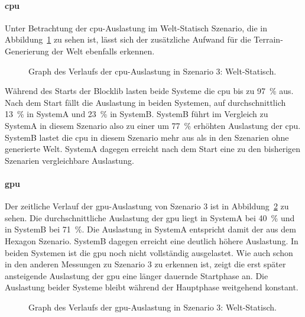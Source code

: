 \paragraph{\ac{cpu}}
Unter Betrachtung der \ac{cpu}-Auslastung im Welt-Statisch Szenario, die in Abbildung~\ref{fig:seed-0-static-cpu} zu sehen ist, lässt sich der zusätzliche Aufwand für die Terrain-Generierung der Welt ebenfalls erkennen.
\begin{figure}[!htbp]
	\caption[Graph des Verlaufs der -Auslastung in Szenario 3: Welt-Statisch.]{Graph des Verlaufs der \ac{cpu}-Auslastung in Szenario 3: Welt-Statisch.}\label{fig:seed-0-static-cpu}
\end{figure}
Während des Starts der Blocklib lasten beide Systeme die \ac{cpu} bis zu \SI{97}{\percent} aus. Nach dem Start fällt die Auslastung in beiden Systemen, auf durchschnittlich \SI{13}{\percent} in SystemA und \SI{23}{\percent} in SystemB.
SystemB führt im Vergleich zu SystemA in diesem Szenario also zu einer um \SI{77}{\percent} erhöhten Auslastung der \ac{cpu}. SystemB lastet die \ac{cpu} in diesem Szenario mehr aus als in den Szenarien ohne generierte Welt. SystemA dagegen erreicht nach dem Start eine zu den bisherigen Szenarien vergleichbare Auslastung.

\paragraph{\ac{gpu}}
Der zeitliche Verlauf der \ac{gpu}-Auslastung von Szenario 3 ist in Abbildung~\ref{fig:seed-0-static-gpu} zu sehen. Die durchschnittliche Auslastung der \ac{gpu} liegt in SystemA bei \SI{40}{\percent} und in SystemB bei \SI{71}{\percent}. Die Auslastung in SystemA entspricht damit der aus dem Hexagon Szenario. SystemB dagegen erreicht eine deutlich höhere Auslastung. In beiden Systemen ist die \ac{gpu} noch nicht vollständig ausgelastet. Wie auch schon in den anderen Messungen zu Szenario 3 zu erkennen ist, zeigt die erst später ansteigende Auslastung der \ac{gpu} eine länger dauernde Startphase an. Die Auslastung beider Systeme bleibt während der Hauptphase weitgehend konstant.
\begin{figure}[!htbp]
	\caption[Graph des Verlaufs der -Auslastung in Szenario 3: Welt-Statisch.]{Graph des Verlaufs der \ac{gpu}-Auslastung in Szenario 3: Welt-Statisch.}\label{fig:seed-0-static-gpu}
\end{figure}

